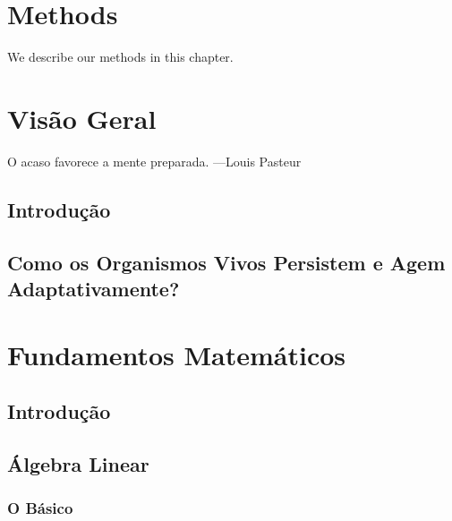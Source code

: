 \documentclass[
]{book}
\begin{document}
\hypertarget{methods}{%
\chapter{Methods}\label{methods}}

We describe our methods in this chapter.

\hypertarget{visuxe3o-geral}{%
\chapter{Visão Geral}\label{visuxe3o-geral}}

O acaso favorece a mente preparada.
---Louis Pasteur

\hypertarget{introduuxe7uxe3o-1}{%
\section{Introdução}\label{introduuxe7uxe3o-1}}

\hypertarget{como-os-organismos-vivos-persistem-e-agem-adaptativamente}{%
\section{Como os Organismos Vivos Persistem e Agem Adaptativamente?}\label{como-os-organismos-vivos-persistem-e-agem-adaptativamente}}

\cleardoublepage

\hypertarget{appendix-apuxeandice}{%
\appendix}


\hypertarget{fundamentos-matemuxe1ticos}{%
\chapter{Fundamentos Matemáticos}\label{fundamentos-matemuxe1ticos}}

\hypertarget{introduuxe7uxe3o-2}{%
\section{Introdução}\label{introduuxe7uxe3o-2}}

\hypertarget{uxe1lgebra-linear}{%
\section{Álgebra Linear}\label{uxe1lgebra-linear}}

\hypertarget{o-buxe1sico}{%
\subsection{O Básico}\label{o-buxe1sico}}
\end{document}
